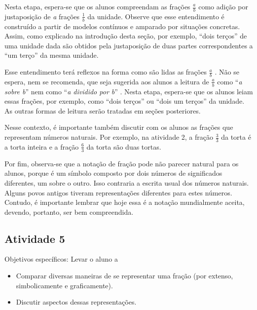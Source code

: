 \documentclass[oneside]{book}
\begin{document}
\begin{multicols}{2}
  Nesta etapa, espera-se que os alunos compreendam as frações   $\frac{a}{b}$   como adição por justaposição de   {\it a}   frações   $\frac{1}{b}$   da unidade. Observe que esse entendimento é construído a partir de modelos contínuos e amparado por situações concretas. Assim, como explicado na introdução desta seção, por exemplo,   ``dois terços''   de uma unidade dada são obtidos pela justaposição de duas partes correspondentes a   ``um terço''   da mesma unidade.

  Esse entendimento terá reflexos na forma como são lidas as frações   $\frac{a}{b}$  . Não se espera, nem se recomenda, que seja sugerida aos alunos a leitura de   $\frac{a}{b}$   como   ``{\it a sobre b}''   nem como   ``{\it a dividido por b}''  . Nesta etapa, espera-se que os alunos leiam essas frações, por exemplo, como   ``dois terços''   ou   ``dois um terços''   da unidade. As outras formas de leitura serão tratadas em seções posteriores.

  Nesse contexto, é importante também discutir com os alunos as frações que representam números naturais. Por exemplo, na atividade 2, a fração   $\frac{3}{3}$   da torta é a torta inteira e a fração   $\frac{6}{3}$   da torta são duas tortas.

  Por fim, observa-se que a notação de fração pode não parecer natural para os alunos, porque é um símbolo composto por dois números de significados diferentes, um sobre o outro. Isso contraria a escrita usual dos números naturais. Alguns povos antigos tiveram representações diferentes para estes números.  Contudo, é importante lembrar que hoje essa é a notação mundialmente aceita, devendo, portanto, ser bem compreendida.



\subsection{Atividade 5}





  Objetivos específicos: Levar o aluno a
\begin{itemize} %
    \item       Comparar diversas maneiras de se representar uma fração (por extenso, simbolicamente e graficamente).
    \item       Discutir aspectos dessas representações.
\end{itemize} %



\end{multicols}
\end{document}
